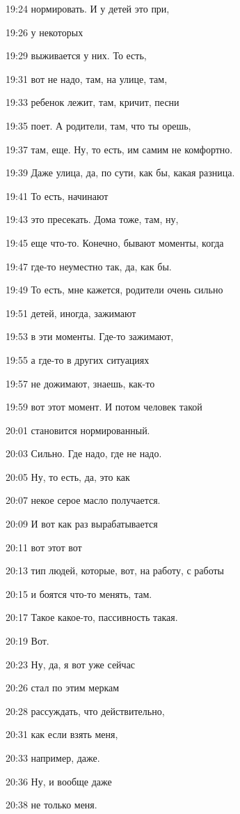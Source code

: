 19:24
нормировать. И у детей это при,

19:26
у некоторых

19:29
выживается у них. То есть,

19:31
вот не надо, там, на улице, там,

19:33
ребенок лежит, там, кричит, песни

19:35
поет. А родители, там, что ты орешь,

19:37
там, еще. Ну, то есть, им самим не комфортно.

19:39
Даже улица, да, по сути, как бы, какая разница.

19:41
То есть, начинают

19:43
это пресекать. Дома тоже, там, ну,

19:45
еще что-то. Конечно, бывают моменты, когда

19:47
где-то неуместно так, да, как бы.

19:49
То есть, мне кажется, родители очень сильно

19:51
детей, иногда, зажимают

19:53
в эти моменты. Где-то зажимают,

19:55
а где-то в других ситуациях

19:57
не дожимают, знаешь, как-то

19:59
вот этот момент. И потом человек такой

20:01
становится нормированный.

20:03
Сильно. Где надо, где не надо.

20:05
Ну, то есть, да, это как

20:07
некое серое масло получается.

20:09
И вот как раз вырабатывается

20:11
вот этот вот

20:13
тип людей, которые, вот, на работу, с работы

20:15
и боятся что-то менять, там.

20:17
Такое какое-то, пассивность такая.

20:19
Вот.

20:23
Ну, да, я вот уже сейчас

20:26
стал по этим меркам

20:28
рассуждать, что действительно,

20:31
как если взять меня,

20:33
например, даже.

20:36
Ну, и вообще даже

20:38
не только меня.

